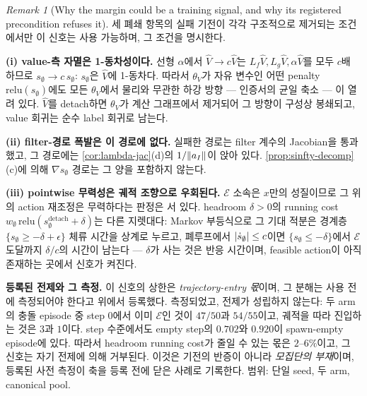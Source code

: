 \documentclass[11pt]{article}
\theoremstyle{plain}
\theoremstyle{definition}
\theoremstyle{remark}
\newtheorem{remark}[theorem]{Remark}
\DeclarePairedDelimiter{\norm}{\lVert}{\rVert}
\DeclarePairedDelimiter{\abs}{\lvert}{\rvert}
\newcommand{\Vhat}{\widehat V}
\newcommand{\Lg}{L_g}
\newcommand{\Lf}{L_f}
\begin{document}
\begin{remark}[Why the margin could be a training signal, and why its registered precondition refuses it]\label{rem:sinfty-signal}
세 폐쇄 항목의 실패 기전이 각각 구조적으로 제거되는 조건에서만 이 신호는 사용 가능하며, 그
조건을 명시한다.

\textbf{(i) value-측 자멸은 1-동차성이다.} 선형 $\alpha$에서 $\Vhat\to c\Vhat$는
$\Lf\Vhat,\Lg\Vhat,\alpha\Vhat$를 모두 $c$배 하므로 $s_\emptyset\to c\,s_\emptyset$:
$s_\emptyset$은 $\Vhat$에 1-동차다. 따라서 $\theta_V$가 자유 변수인 어떤 penalty
$\mathrm{relu}(s_\emptyset)$에도 모든 $\theta_V$에서 물리와 무관한 하강 방향 --- 인증서의
균일 축소 --- 이 열려 있다. $\Vhat$를 detach하면 $\theta_V$가 계산 그래프에서 제거되어 그 방향이
구성상 봉쇄되고, value 회귀는 순수 label 회귀로 남는다.

\textbf{(ii) filter-경로 폭발은 이 경로에 없다.} 실패한 경로는 filter 계수의 Jacobian을
통과했고, 그 경로에는 \cref{cor:lambda-jac}(d)의 $1/\norm{a_I}$이 앉아 있다.
\cref{prop:sinfty-decomp}(c)에 의해 $\nabla s_\emptyset$ 경로는 그 양을 포함하지 않는다.

\textbf{(iii) pointwise 무력성은 궤적 조향으로 우회된다.} $\mathcal E$ 소속은 $x$만의
성질이므로 그 위의 action 재조정은 무력하다는 판정은 서 있다. headroom $\delta>0$의 running
cost $w_\emptyset\,\mathrm{relu}(s_\emptyset^{\mathrm{detach}}+\delta)$는 다른 지렛대다:
Markov 부등식으로 그 기대 적분은 경계층 $\{s_\emptyset\ge-\delta+\epsilon\}$ 체류 시간을 상계로
누르고, 폐루프에서 $\abs{\dot s_\emptyset}\le c$이면 $\{s_\emptyset\le-\delta\}$에서
$\mathcal E$ 도달까지 $\delta/c$의 시간이 남는다 --- $\delta$가 사는 것은 반응 시간이며,
feasible action이 아직 존재하는 곳에서 신호가 켜진다.

\textbf{등록된 전제와 그 측정.} 이 신호의 상한은 \emph{trajectory-entry 몫}이며, 그 분해는
사용 전에 측정되어야 한다고 위에서 등록했다. 측정되었고, 전제가 성립하지 않는다: 두 arm의
충돌 episode 중 step $0$에서 이미 $\mathcal E$인 것이 $47/50$과 $54/55$이고, 궤적을 따라
진입하는 것은 $3$과 $1$이다. step 수준에서도 empty step의 $0.702$와 $0.920$이 spawn-empty
episode에 있다. 따라서 headroom running cost가 줄일 수 있는 몫은 $2$--$6\%$이고, 그 신호는
자기 전제에 의해 거부된다. 이것은 기전의 반증이 아니라 \emph{모집단의 부재}이며, 등록된
사전 측정이 축을 등록 전에 닫은 사례로 기록한다. 범위: 단일 seed, 두 arm, canonical pool.
\end{remark}
\end{document}
